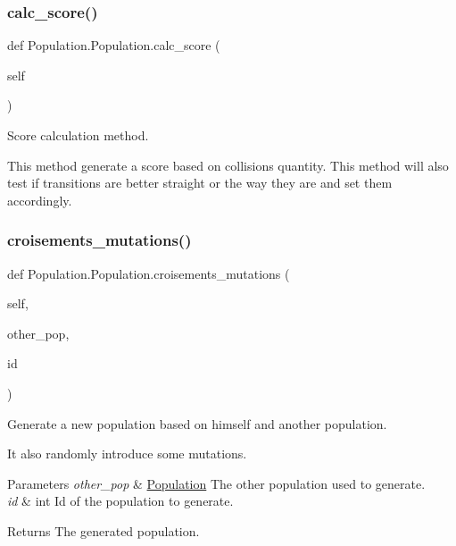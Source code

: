 \subsubsection{\texorpdfstring{calc\_score()}{calc\_score()}}
{\footnotesize\ttfamily def Population.\+Population.\+calc\+\_\+score (\begin{DoxyParamCaption}\item[{}]{self }\end{DoxyParamCaption})}



Score calculation method. 

This method generate a score based on collision\textquotesingle{}s quantity. This method will also test if transitions are better straight or the way they are and set them accordingly. \mbox{\label{classPopulation_1_1Population_a272d86ca139afe3150dff771d71cfea7}} 
\subsubsection{\texorpdfstring{croisements\_mutations()}{croisements\_mutations()}}
{\footnotesize\ttfamily def Population.\+Population.\+croisements\+\_\+mutations (\begin{DoxyParamCaption}\item[{}]{self,  }\item[{}]{other\+\_\+pop,  }\item[{}]{id }\end{DoxyParamCaption})}



Generate a new population based on himself and another population. 

It also randomly introduce some mutations. 
\begin{DoxyParams}{Parameters}
{\em other\+\_\+pop} & \mbox{\hyperlink{classPopulation_1_1Population}{Population}} The other population used to generate. \\
\hline
{\em id} & int Id of the population to generate. \\
\hline
\end{DoxyParams}
\begin{DoxyReturn}{Returns}
The generated population. 
\end{DoxyReturn}
\mbox{\label{classPopulation_1_1Population_a4cc44224df33f24169a98661748e7fca}} 
